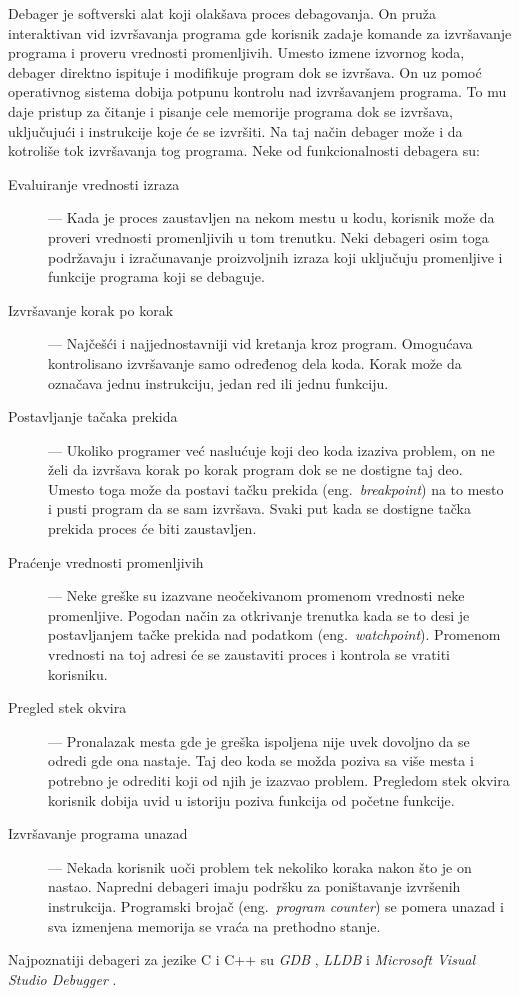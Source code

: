 \documentclass[12pt,oneside]{memoir}
\begin{document}
Debager je softverski alat koji olakšava proces debagovanja.
On pruža interaktivan vid izvršavanja programa gde korisnik zadaje komande za izvršavanje programa i proveru vrednosti promenljivih.
Umesto izmene izvornog koda, debager direktno ispituje i modifikuje program dok se izvršava.
On uz pomoć operativnog sistema dobija potpunu kontrolu nad izvršavanjem programa.
To mu daje pristup za čitanje i pisanje cele memorije programa dok se izvršava, uključujući i instrukcije koje će se izvršiti.
Na taj način debager može i da kotroliše tok izvršavanja tog programa.
Neke od funkcionalnosti debagera su: %
\begin{description}
  \item[Evaluiranje vrednosti izraza] --- Kada je proces zaustavljen na nekom mestu u kodu, korisnik može da proveri vrednosti promenljivih u tom trenutku. Neki debageri osim toga podržavaju i izračunavanje proizvoljnih izraza koji uključuju promenljive i funkcije programa koji se debaguje.
  \item[Izvršavanje korak po korak] --- Najčešći i najjednostavniji vid kretanja kroz program. Omogućava kontrolisano izvršavanje samo određenog dela koda. Korak može da označava jednu instrukciju, jedan red ili jednu funkciju. %
  \item[Postavljanje tačaka prekida] --- Ukoliko programer već naslućuje koji deo koda izaziva problem, on ne želi da izvršava korak po korak program dok se ne dostigne taj deo. Umesto toga može da postavi tačku prekida (eng.~{\em breakpoint}) na to mesto i pusti program da se sam izvršava. Svaki put kada se dostigne tačka prekida proces će biti zaustavljen. %
  \item[Praćenje vrednosti promenljivih] --- Neke greške su izazvane neočekivanom promenom vrednosti neke promenljive. Pogodan način za otkrivanje trenutka kada se to desi je postavljanjem tačke prekida nad podatkom (eng.~{\em watchpoint}). Promenom vrednosti na toj adresi će se zaustaviti proces i kontrola se vratiti korisniku.
  \item[Pregled stek okvira] --- Pronalazak mesta gde je greška ispoljena nije uvek dovoljno da se odredi gde ona nastaje. Taj deo koda se možda poziva sa više mesta i potrebno je odrediti koji od njih je izazvao problem. Pregledom stek okvira korisnik dobija uvid u istoriju poziva funkcija od početne funkcije.
  \item[Izvršavanje programa unazad] --- Nekada korisnik uoči problem tek nekoliko koraka nakon što je on nastao. Napredni debageri imaju podršku za poništavanje izvršenih instrukcija. Programski brojač (eng.~{\em program counter}) se pomera unazad i sva izmenjena memorija se vraća na prethodno stanje.
\end{description}
Najpoznatiji debageri za jezike C i C++ su \textit{GDB} \cite{gdb}, \textit{LLDB} \cite{lldb} i \textit{Microsoft Visual Studio Debugger} \cite{msvcd}.
\end{document}

